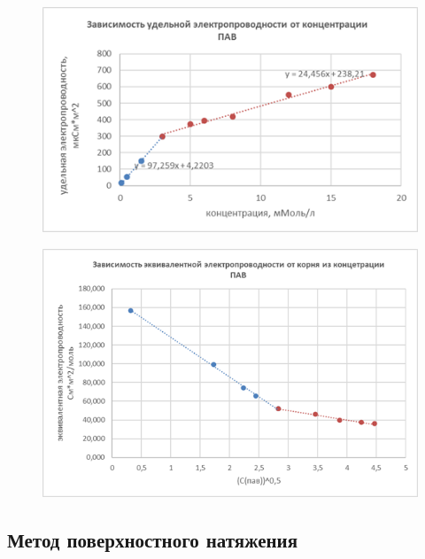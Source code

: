 \documentclass[a4paper,12pt]{article} %
\begin{document}
\newpage

\begin{figure}[t]

\includegraphics[width=1\textwidth]{image009.png}
\caption{}
\end{figure}

\begin{figure}[h!]
\includegraphics[width=1\textwidth]{image008.png}
\caption{}
\end{figure}


\newpage


\subsection{Метод поверхностного натяжения}
\end{document}
